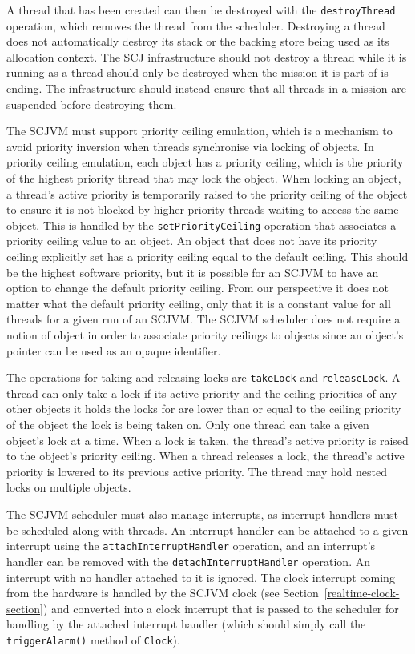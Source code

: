 A thread that has been created can then be destroyed with the
\texttt{destroy\-Thread} operation, which removes the thread from the
scheduler.
Destroying a thread does not automatically destroy its stack or the
backing store being used as its allocation context.
The SCJ infrastructure should not destroy a thread while it is running
as a thread should only be destroyed when the mission it is part of is
ending.
The infrastructure should instead ensure that all threads in a mission
are suspended before destroying them.

The SCJVM must support priority ceiling emulation, which is a
mechanism to avoid priority inversion when threads synchronise via
locking of objects.
In priority ceiling emulation, each object has a priority ceiling,
which is the priority of the highest priority thread that may lock the
object.
When locking an object, a thread's active priority is temporarily
raised to the priority ceiling of the object to ensure it is not
blocked by higher priority threads waiting to access the same object.
This is handled by the \texttt{set\-Priority\-Ceiling} operation that
associates a priority ceiling value to an object.
An object that does not have its priority ceiling explicitly set has a
priority ceiling equal to the default ceiling.
This should be the highest software priority, but it is possible for
an SCJVM to have an option to change the default priority ceiling.
From our perspective it does not matter what the default priority
ceiling, only that it is a constant value for all threads for a given
run of an SCJVM.
The SCJVM scheduler does not require a notion of object in order to
associate priority ceilings to objects since an object's pointer can
be used as an opaque identifier.

The operations for taking and releasing locks are \texttt{takeLock}
and \texttt{releaseLock}.
A thread can only take a lock if its active priority and the ceiling
priorities of any other objects it holds the locks for are lower than
or equal to the ceiling priority of the object the lock is being taken
on.
Only one thread can take a given object's lock at a time.
When a lock is taken, the thread's active priority is raised to the
object's priority ceiling.
When a thread releases a lock, the thread's active priority is lowered
to its previous active priority.
The thread may hold nested locks on multiple objects.

The SCJVM scheduler must also manage interrupts, as interrupt handlers
must be scheduled along with threads.
An interrupt handler can be attached to a given interrupt using the
\texttt{attach\-Interrupt\-Handler} operation, and an interrupt's
handler can be removed with the \texttt{detach\-Interrupt\-Handler}
operation.
An interrupt with no handler attached to it is ignored.
The clock interrupt coming from the hardware is handled by the SCJVM
clock (see Section~\ref{realtime-clock-section}) and converted into a
clock interrupt that is passed to the scheduler for handling by the
attached interrupt handler (which should simply call the
\texttt{triggerAlarm()} method of \texttt{Clock}).

